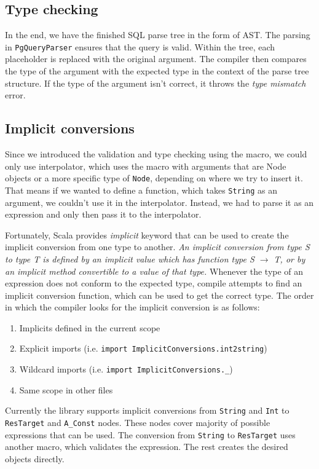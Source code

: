 \subsection{Type checking}
In the end, we have the finished SQL parse tree in the form of AST. 
The parsing in \texttt{PgQueryParser} ensures that the query is valid.
Within the tree, each placeholder is replaced with the original argument. The compiler then compares the type of the argument with the expected type in the context of the parse tree structure. If the type of the argument isn't correct, it throws the \textit{type mismatch} error.

\subsection{Implicit conversions}
Since we introduced the validation and type checking using the macro, we could only use interpolator, which uses the macro with arguments that are Node objects or a more specific type of \texttt{Node}, depending on where we try to insert it. That means if we wanted to define a function, which takes \texttt{String} as an argument, we couldn't use it in the interpolator. Instead, we had to parse it as an expression and only then pass it to the interpolator.

Fortunately, Scala provides \textit{implicit} keyword that can be used to create the implicit conversion from one type to another. \textit{An implicit conversion from type S to type T is defined by an implicit value which has function type S $\rightarrow$ T, or by an implicit method convertible to a value of that type.}\cite{Implicit} Whenever the type of an expression does not conform to the expected type, compile attempts to find an implicit conversion function, which can be used to get the correct type. The order in which the compiler looks for the implicit conversion is as follows: \cite{Looking up Implicits}
\begin{enumerate}
  \item Implicits defined in the current scope
  \item Explicit imports (i.e. \texttt{import ImplicitConversions.int2string})
  \item Wildcard imports (i.e. \texttt{import ImplicitConversions.\_})
  \item Same scope in other files
\end{enumerate}

Currently the library supports implicit conversions from \texttt{String} and \texttt{Int} to \texttt{ResTarget} and \texttt{A\_Const} nodes. These nodes cover majority of possible expressions that can be used. The conversion from \texttt{String} to \texttt{ResTarget} uses another macro, which validates the expression. The rest creates the desired objects directly.


